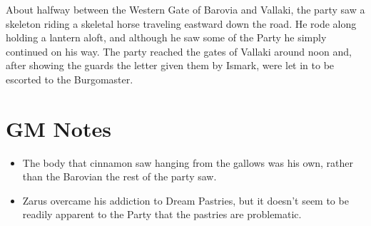 \documentclass[a4paper,11pt]{article}
\begin{document}
About halfway between the Western Gate of Barovia and Vallaki, the party saw a skeleton riding a skeletal horse
traveling eastward down the road. He rode along holding a lantern aloft, and although he saw some of the Party he 
simply continued on his way. The party reached the gates of Vallaki around noon and, after showing the guards the 
letter given them by Ismark, were let in to be escorted to the Burgomaster.

\section{GM Notes}
\begin{itemize}
  \item The body that cinnamon saw hanging from the gallows was his own, rather than the Barovian the rest of the 
  party saw.
  \item Zarus overcame his addiction to Dream Pastries, but it doesn't seem to be readily apparent to the Party
  that the pastries are problematic.
\end{itemize}
\end{document}
